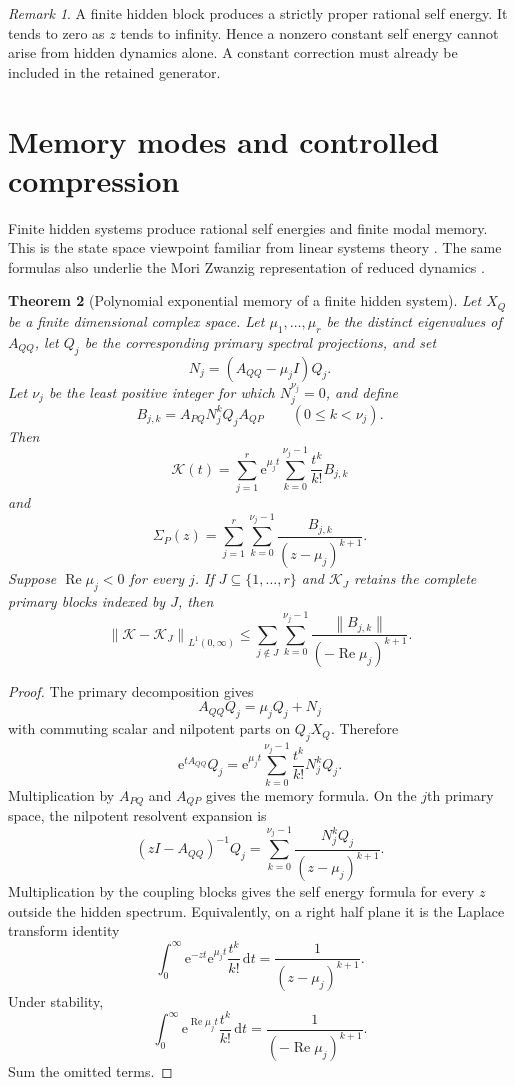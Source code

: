 \documentclass[11pt,a4paper]{article}
\newtheorem{theorem}{Theorem}[section]
\theoremstyle{definition}
\theoremstyle{remark}
\newtheorem{remark}[theorem]{Remark}
\newcommand{\norm}[1]{\left\lVert#1\right\rVert}
\newcommand{\Kcal}{\mathcal K}
\newcommand{\e}{\mathrm e}
\newcommand{\dd}{\,\mathrm d}
\begin{document}
\begin{remark}\label{extended:record:088}
A finite hidden block produces a strictly proper rational self energy. It tends to zero as \(z\) tends to infinity. Hence a nonzero constant self energy cannot arise from hidden dynamics alone. A constant correction must already be included in the retained generator.
\end{remark}

\section{Memory modes and controlled compression}\label{extended:section:15}\label{extended:sec:memory_compression}

Finite hidden systems produce rational self energies and finite modal memory. This is the state space viewpoint familiar from linear systems theory \cite{Kailath1980}. The same formulas also underlie the Mori Zwanzig representation of reduced dynamics \cite{Zwanzig1961,ChorinHaldKupferman2000}.

\begin{theorem}[Polynomial exponential memory of a finite hidden system]\label{extended:record:089}\label{extended:thm:modal_memory}
Let \(X_Q\) be a finite dimensional complex space. Let \(\mu_1,\ldots,\mu_r\) be the distinct eigenvalues of \(A_{QQ}\), let \(Q_j\) be the corresponding primary spectral projections, and set
\[
N_j=(A_{QQ}-\mu_jI)Q_j.
\]
Let \(\nu_j\) be the least positive integer for which \(N_j^{\nu_j}=0\), and define
\[
B_{j,k}
=
A_{PQ}N_j^kQ_jA_{QP}
\qquad
(0\leq k<\nu_j).
\]
Then
\[
\Kcal(t)
=
\sum_{j=1}^r
\e^{\mu_jt}
\sum_{k=0}^{\nu_j-1}
\frac{t^k}{k!}B_{j,k}
\]
and
\[
\Sigma_P(z)
=
\sum_{j=1}^r
\sum_{k=0}^{\nu_j-1}
\frac{B_{j,k}}{(z-\mu_j)^{k+1}}.
\]
Suppose \(\operatorname{Re}\mu_j<0\) for every \(j\). If \(J\subseteq\{1,\ldots,r\}\) and \(\Kcal_J\) retains the complete primary blocks indexed by \(J\), then
\[
\norm{\Kcal-\Kcal_J}_{L^1(0,\infty)}
\leq
\sum_{j\notin J}
\sum_{k=0}^{\nu_j-1}
\frac{\norm{B_{j,k}}}
{(-\operatorname{Re}\mu_j)^{k+1}}.
\]
\end{theorem}

\begin{proof}
The primary decomposition gives
\[
A_{QQ}Q_j=\mu_jQ_j+N_j
\]
with commuting scalar and nilpotent parts on \(Q_jX_Q\). Therefore
\[
\e^{tA_{QQ}}Q_j
=
\e^{\mu_jt}
\sum_{k=0}^{\nu_j-1}
\frac{t^k}{k!}N_j^kQ_j.
\]
Multiplication by \(A_{PQ}\) and \(A_{QP}\) gives the memory formula. On the \(j\)th primary space, the nilpotent resolvent expansion is
\[
(zI-A_{QQ})^{-1}Q_j
=
\sum_{k=0}^{\nu_j-1}
\frac{N_j^kQ_j}{(z-\mu_j)^{k+1}}.
\]
Multiplication by the coupling blocks gives the self energy formula for every \(z\) outside the hidden spectrum. Equivalently, on a right half plane it is the Laplace transform identity
\[
\int_0^\infty
\e^{-zt}\e^{\mu_jt}
\frac{t^k}{k!}
\dd t
=
\frac{1}{(z-\mu_j)^{k+1}}.
\]
Under stability,
\[
\int_0^\infty
\e^{\operatorname{Re}\mu_jt}
\frac{t^k}{k!}
\dd t
=
\frac{1}{(-\operatorname{Re}\mu_j)^{k+1}}.
\]
Sum the omitted terms.
\end{proof}
\end{document}
